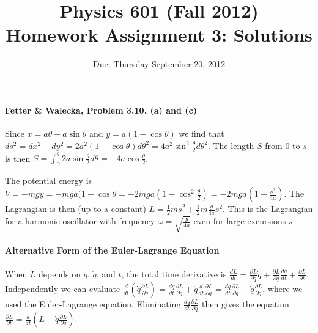 \documentclass[letterpaper,11pt]{article}
\title{Physics 601 (Fall 2012) \\ Homework Assignment 3: Solutions}
\date{Due: Thursday September 20, 2012}
\begin{document}
\maketitle

\paragraph*{Fetter \& Walecka, Problem 3.10, (a) and (c)}
Since $x = a\theta - a\sin\theta$ and $y = a(1 - \cos\theta)$ we find that $ds^2 = dx^2 + dy^2 = 2a^2(1-\cos\theta)d\theta^2 = 4a^2\sin^2\frac{\theta}{2}d\theta^2$.  The length $S$ from 0 to $s$ is then $S = \int_0^\theta 2a\sin\frac{\theta}{2}d\theta = -4a\cos\frac{\theta}{2}$.

The potential energy is $V = -mgy = -mga(1-\cos\theta = -2mga(1-\cos^2\frac{\theta}{2}) = -2mga\left(1 - \frac{s^2}{4a}\right)$.  The Lagrangian is then (up to a constant) $L = \frac{1}{2}m\dot{s}^2 + \frac{1}{2}m\frac{g}{4a}s^2$.  This is the Lagrangian for a harmonic oscillator with frequency $\omega = \sqrt{\frac{g}{4a}}$ even for large excursions $s$.

\paragraph*{Alternative Form of the Euler-Lagrange Equation}
When $L$ depends on $q$, $\dot{q}$, and $t$, the total time derivative is $\frac{dL}{dt} = \frac{\partial L}{\partial q} \dot{q} + \frac{\partial L}{\partial \dot{q}} \frac{d\dot{q}}{dt} + \frac{\partial L}{\partial t}$.  Independently we can evaluate $\frac{d}{dt} \left( \dot{q} \frac{\partial L}{\partial \dot{q}} \right) = \frac{d\dot{q}}{dt} \frac{\partial L}{\partial \dot{q}} + \dot{q} \frac{d}{dt} \frac{\partial L}{\partial \dot{q}} = \frac{d\dot{q}}{dt} \frac{\partial L}{\partial \dot{q}} + \dot{q} \frac{\partial L}{\partial q}$, where we used the Euler-Lagrange equation.  Eliminating $\frac{d\dot{q}}{dt} \frac{\partial L}{\partial \dot{q}}$ then gives the equation $\frac{\partial L}{\partial t} = \frac{d}{dt} \left( L - \dot{q} \frac{\partial L}{\partial \dot{q}} \right)$.
\end{document}
